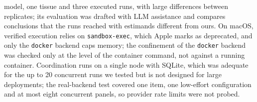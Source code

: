 model, one tissue and three executed runs, with large differences between replicates; its evaluation was drafted with LLM assistance and compares conclusions that the runs reached with estimands different from ours. On macOS, verified execution relies on \texttt{sandbox-exec}, which Apple marks as deprecated, and only the \texttt{docker} backend caps memory; the confinement of the \texttt{docker} backend was checked only at the level of the container command, not against a running container. Coordination runs on a single node with SQLite, which was adequate for the up to 20 concurrent runs we tested but is not designed for large deployments; the real-backend test covered one item, one low-effort configuration and at most eight concurrent panels, so provider rate limits were not probed.
